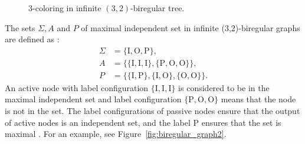 \begin{figure}[H]
{  }
  \caption{
    3-coloring in infinite $(3,2)$-biregular tree.
  }
  \label{fig:biregular_graph1}
\end{figure}

The sets $\Sigma, A$ and $P$ of maximal independent set in infinite (3,2)-biregular graphs are defined \cite{HirvonenSuomelaDistAlg2020} as :
\begin{align*}
  \Sigma &= \mathrm{\{I,O,P\}}, \\
  A &= \mathrm{\{\{I,I,I\},\{P,O,O\}\}}, \\
  P &= \mathrm{\{\{I,P\},\{I,O\},\{O,O\}\}}.
\end{align*}
An active node with label configuration $\mathrm{\{I,I,I\}}$ is considered to be in the maximal independent set and label configuration $\mathrm{\{P,O,O\}}$ means that the node is not in the set.
The label configurations of passive nodes ensure that the output of active nodes is an independent set, and the label $\mathrm{P}$ ensures that the set is maximal \cite{HirvonenSuomelaDistAlg2020}.
For an example, see Figure~\ref{fig:biregular_graph2}.

